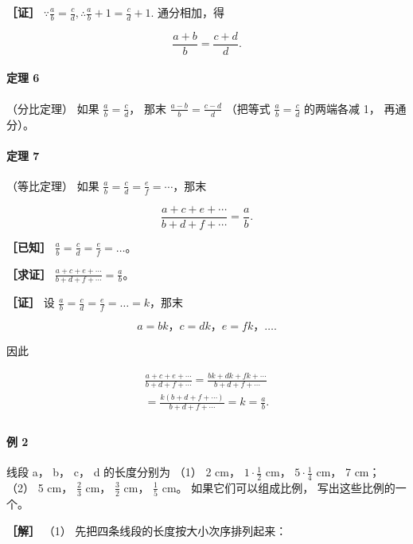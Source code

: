 \textbf{［证］}
\(\because \frac{a}{b} = \frac{c}{d}, \therefore \frac{a}{b} + 1 = \frac{c}{d} + 1.\)
通分相加，得

\[
\frac {a + b}{b} = \frac {c + d}{d}.
\]

\paragraph{定理 6}

（分比定理） 如果 \(\frac{a}{b} = \frac{c}{d}\)， 那末
\(\frac{a - b}{b} = \frac{c - d}{d}\) （把等式
\(\frac{a}{b} = \frac{c}{d}\) 的两端各减 1， 再通分）。

\paragraph{定理 7}

（等比定理） 如果
\(\frac{a}{b} = \frac{c}{d} = \frac{e}{f} = \cdots\)，那末

\[
\frac {a + c + e + \cdots}{b + d + f + \cdots} = \frac {a}{b}.
\]

\textbf{［已知］} \(\frac{a}{b} = \frac{c}{d} = \frac{e}{f} = \dots\)。

\textbf{［求证］}
\(\frac{a + c + e + \cdots}{b + d + f + \cdots} = \frac{a}{b}\)。

\textbf{［证］} 设
\(\frac{a}{b} = \frac{c}{d} = \frac{e}{f} = \dots = k\)，那末

\[
a = b k\text{，} c = d k\text{，} e = f k\text{，} \dots.
\]

因此

\[
\begin{array}{l} \frac {a + c + e + \cdots}{b + d + f + \cdots} = \frac {b k + d k + f k + \cdots}{b + d + f + \cdots} \\ = \frac {k (b + d + f + \cdots)}{b + d + f + \cdots} = k = \frac {a}{b}. \\ \end{array}
\]

\paragraph{例 2}

线段 a， b， c， d 的长度分别为 （1） 2 cm， \(1 \cdot \frac{1}{2}\)
cm， \(5 \cdot \frac{1}{4}\) cm， 7 cm； （2） 5 cm， \(\frac{2}{3}\)
cm， \(\frac{3}{2}\) cm， \(\frac{1}{5}\) cm。 如果它们可以组成比例，
写出这些比例的一个。

\textbf{［解］} （1） 先把四条线段的长度按大小次序排列起来：

